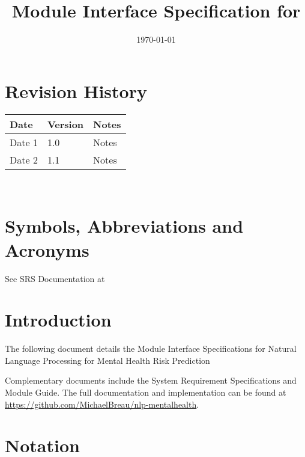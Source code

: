 \documentclass[12pt, titlepage]{article}
\begin{document}
\title{Module Interface Specification for \progname{}}

\author{\authname}

\date{\today}

\maketitle


\section{Revision History}

\begin{tabularx}{\textwidth}{p{3cm}p{2cm}X}
\toprule {\bf Date} & {\bf Version} & {\bf Notes}\\
\midrule
Date 1 & 1.0 & Notes\\
Date 2 & 1.1 & Notes\\
\bottomrule
\end{tabularx}

~\newpage

\section{Symbols, Abbreviations and Acronyms}

See SRS Documentation at 


\newpage

\tableofcontents

\newpage


\section{Introduction}

The following document details the Module Interface Specifications for
Natural Language Processing for Mental Health Risk Prediction 

Complementary documents include the System Requirement Specifications
and Module Guide.  The full documentation and implementation can be
found at \url{https://github.com/MichaelBreau/nlp-mentalhealth}.

\section{Notation}
\end{document}

